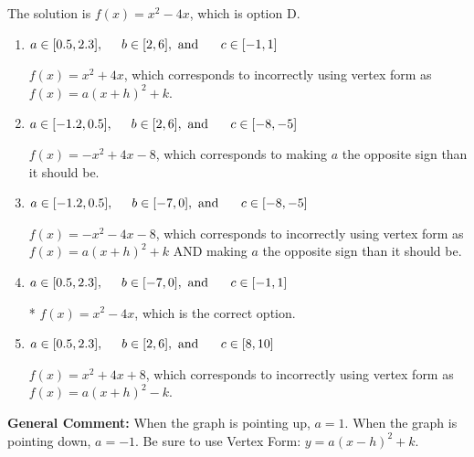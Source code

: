\documentclass{extbook}[14pt]
\begin{document}
\begin{enumerate}
{The solution is \( f(x) = x^{2} -4 x \), which is option D.\begin{enumerate}[label=\Alph*.]
\item \( a \in [0.5, 2.3], \hspace*{5mm} b \in [2, 6], \text{ and } \hspace*{5mm} c \in [-1, 1] \)

$f(x)=x^{2} +4 x$, which corresponds to incorrectly using vertex form as $f(x) = a(x+h)^2+k$.
\item \( a \in [-1.2, 0.5], \hspace*{5mm} b \in [2, 6], \text{ and } \hspace*{5mm} c \in [-8, -5] \)

$f(x)=-x^{2} +4 x -8$, which corresponds to making $a$ the opposite sign than it should be.
\item \( a \in [-1.2, 0.5], \hspace*{5mm} b \in [-7, 0], \text{ and } \hspace*{5mm} c \in [-8, -5] \)

$f(x)=-x^{2} -4 x -8$, which corresponds to incorrectly using vertex form as $f(x) = a(x+h)^2+k$ AND making $a$ the opposite sign than it should be.
\item \( a \in [0.5, 2.3], \hspace*{5mm} b \in [-7, 0], \text{ and } \hspace*{5mm} c \in [-1, 1] \)

* $f(x)=x^{2} -4 x$, which is the correct option.
\item \( a \in [0.5, 2.3], \hspace*{5mm} b \in [2, 6], \text{ and } \hspace*{5mm} c \in [8, 10] \)

$f(x)=x^{2} +4 x + 8$, which corresponds to incorrectly using vertex form as $f(x) = a(x+h)^2 - k$.
\end{enumerate}

\textbf{General Comment:} When the graph is pointing up, $a=1$. When the graph is pointing down, $a=-1$. Be sure to use Vertex Form: $y = a(x-h)^2+k$.
}
\end{enumerate}
\end{document}

